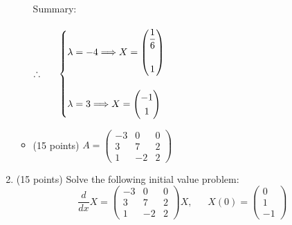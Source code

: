 \documentclass[fleqn]{article}
\begin{document}
\begin{enumerate}
\begin{itemize}
{          \\
          Summary:
          \\
          \\
          $
            \therefore ~~~~~ \begin{cases}
              \lambda=-4 \Longrightarrow X=\begin{pmatrix}
                \dfrac{1}{6}
                \\
                \\
                1
              \end{pmatrix}
              \\
              \\
              \lambda=3 \Longrightarrow X=\begin{pmatrix}
                -1
                \\
                1
              \end{pmatrix}
            \end{cases}
            \\
            \\
          $
        }
  
      \item (15 points) $A=\begin{pmatrix}
        -3 & 0 & 0
        \\
        3 & 7 & 2
        \\
        1 & -2 & 2
      \end{pmatrix}$
    \end{itemize}

    \item (15 points) Solve the following initial value problem:
    $$
      \dfrac{d}{dx} X=\begin{pmatrix}
        -3 & 0 & 0
        \\
        3 & 7 & 2 
        \\
        1 & -2 & 2
      \end{pmatrix} X, ~~~~~~~ X(0)=\begin{pmatrix}
        0 
        \\
        1
        \\
        -1
      \end{pmatrix}
    $$


\end{enumerate}
\end{document}
